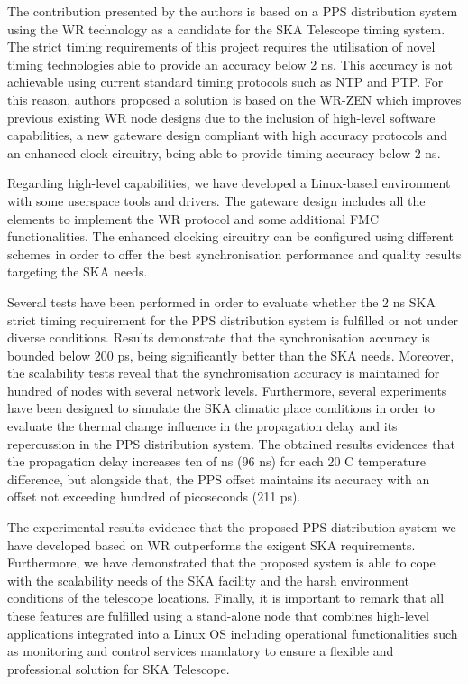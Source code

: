 The contribution presented by the authors is based on a PPS distribution system using the WR technology as a candidate for the SKA Telescope timing system. The strict timing requirements of this project requires the utilisation of novel timing technologies able to provide an accuracy below 2 ns. This accuracy is not achievable using current standard timing protocols such as NTP and PTP.
For this reason, authors proposed a solution is based on the WR-ZEN which improves previous existing WR node designs 
due to the inclusion of high-level software capabilities, a new gateware design compliant with high accuracy protocols and an enhanced clock circuitry, being able to provide timing accuracy below 2 ns.

Regarding high-level capabilities, we have developed a Linux-based environment with some userspace tools and drivers. The gateware design includes all the elements to implement the WR protocol and some additional FMC functionalities. The enhanced clocking circuitry can be configured using different schemes in order to offer the best synchronisation performance and quality results targeting the SKA needs. 

Several tests have been performed in order to evaluate whether the 2 ns SKA strict timing requirement for the PPS distribution system is fulfilled or not under diverse conditions.
Results demonstrate that the synchronisation accuracy is bounded below 200 ps, being significantly better than the SKA needs. Moreover, the scalability tests reveal that the synchronisation accuracy is maintained for hundred of nodes with several network levels. 
Furthermore, several experiments have been designed to simulate the SKA climatic place conditions 
in order to evaluate the thermal change influence in the propagation delay 
and its repercussion in the PPS distribution system. The obtained results evidences that the propagation delay increases ten of ns (96 ns) for each 20 C temperature difference, but alongside that, the PPS offset maintains its accuracy with an offset not exceeding hundred of picoseconds (211 ps). 

The experimental results evidence that the proposed PPS distribution system we have developed based on WR outperforms the exigent SKA requirements. Furthermore, we have demonstrated that the proposed system is able to cope with the scalability needs of the SKA facility and the harsh environment conditions of the telescope locations. 
Finally, it is important to remark that all these features are fulfilled using a stand-alone node that combines high-level applications integrated into a Linux OS including operational functionalities such as monitoring and control services mandatory to  ensure a flexible and professional solution for SKA Telescope.


